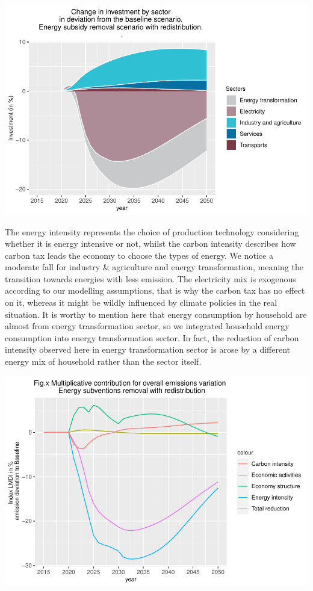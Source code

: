 \documentclass[
]{article}
\begin{document}
\begin{center}\includegraphics[width=0.7\linewidth,height=0.7\textheight]{Modele-ThreeMe-Tunisie_Sequeira_Valilou_Wang_files/figure-latex/unnamed-chunk-26-1} \end{center}

The energy intensity represents the choice of production technology
considering whether it is energy intensive or not, whilst the carbon
intensity describes how carbon tax leads the economy to choose the types
of energy. We notice a moderate fall for industry \& agriculture and
energy transformation, meaning the transition towards energies with less
emission. The electricity mix is exogenous according to our modelling
assumptions, that is why the carbon tax has no effect on it, whereas it
might be wildly influenced by climate policies in the real situation. It
is worthy to mention here that energy consumption by household are
almost from energy transformation sector, so we integrated household
energy consumption into energy transformation sector. In fact, the
reduction of carbon intensity observed here in energy transformation
sector is arose by a different energy mix of household rather than the
sector itself.

\begin{center}\includegraphics[width=0.7\linewidth,height=0.7\textheight]{Modele-ThreeMe-Tunisie_Sequeira_Valilou_Wang_files/figure-latex/unnamed-chunk-27-1} \end{center}
\end{document}
